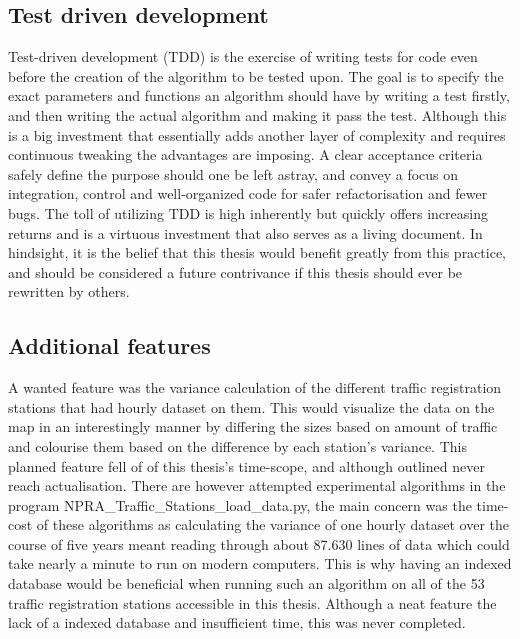 \subsection{Test driven development}
Test-driven development (TDD) is the exercise of writing tests for code even before the creation of the algorithm to be tested upon. The goal is to specify the exact parameters and functions an algorithm should have by writing a test firstly, and then writing the actual algorithm and making it pass the test. Although this is a big investment that essentially adds another layer of complexity and requires continuous tweaking the advantages are imposing. A clear acceptance criteria safely define the purpose should one be left astray, and convey a focus on integration, control and well-organized code for safer refactorisation and fewer bugs. The toll of utilizing TDD is high inherently but quickly offers increasing returns and is a virtuous investment that also serves as a living document.
In hindsight, it is the belief that this thesis would benefit greatly from this practice, and should be considered a future contrivance if this thesis should ever be rewritten by others.

\subsection{Additional features}
A wanted feature was the variance calculation of the different traffic registration stations that had hourly dataset on them. This would visualize the data on the map in an interestingly manner by differing the sizes based on amount of traffic and colourise them based on the difference by each station's variance. This planned feature fell of of this thesis's time-scope, and although outlined never reach actualisation. There are however attempted experimental algorithms in the program NPRA\_Traffic\_Stations\_load\_data.py, the main concern was the time-cost of these algorithms as calculating the variance of one hourly dataset over the course of five years meant reading through about 87.630 lines of data which could take nearly a minute to run on modern computers. This is why having an indexed database would be beneficial when running such an algorithm on all of the 53 traffic registration stations accessible in this thesis. Although a neat feature the lack of a indexed database and insufficient time, this was never completed.


